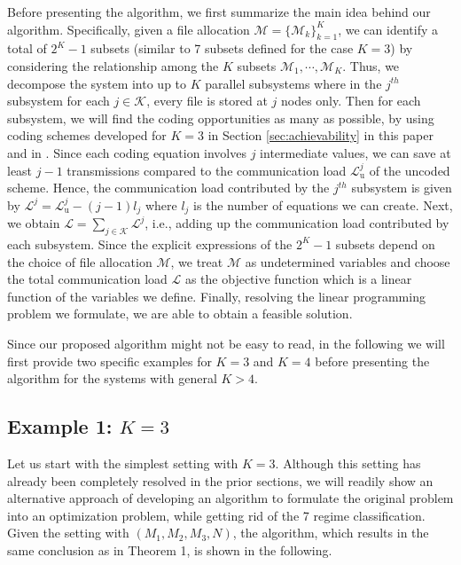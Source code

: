 \documentclass[conference]{IEEEtran}
\begin{document}
Before presenting the algorithm, we first summarize the main idea behind our algorithm. Specifically, given a file allocation $\mathcal{M}=\{\mathcal{M}_k\}_{k=1}^K$, we can identify a total of $2^K-1$ subsets (similar to 7 subsets defined for the case $K=3$) by considering the relationship among the $K$ subsets $\mathcal{M}_1,\cdots,\mathcal{M}_K$. Thus, we decompose the system into up to $K$ parallel subsystems where in the $j^{th}$ subsystem for each $j\in\mathcal{K}$, every file is stored at $j$ nodes only. Then for each subsystem, we will find the coding opportunities as many as possible, by using coding schemes developed for $K=3$ in Section \ref{sec:achievability} in this paper and in \cite{Avestimehr_CDC}. Since each coding equation involves $j$ intermediate values, we can save at least $j-1$ transmissions compared to the communication load $\mathcal{L}^j_{\textrm{u}}$ of the uncoded scheme. Hence, the communication load contributed by the $j^{th}$ subsystem is given by $\mathcal{L}^j=\mathcal{L}^j_{\textrm{u}}-(j-1)l_j$ where $l_j$ is the number of equations we can create. Next, we obtain $\mathcal{L}=\sum_{j\in\mathcal{K}} \mathcal{L}^j$, i.e., adding up the communication load contributed by each subsystem. Since the explicit expressions of the $2^K-1$ subsets depend on the choice of file allocation $\mathcal{M}$, we treat $\mathcal{M}$ as undetermined variables and choose the total communication load $\mathcal{L}$ as the objective function which is a linear function of the variables we define. Finally, resolving the linear programming problem we formulate, we are able to obtain a feasible solution.

Since our proposed algorithm might not be easy to read, in the following we will first provide two specific examples for $K=3$ and $K=4$ before presenting the algorithm for the systems with general $K>4$.



\subsection{Example 1: $K=3$}

Let us start with the simplest setting with $K=3$. Although this setting has already been completely resolved in the prior sections, we will readily show an alternative approach of developing an algorithm to formulate the original problem into an optimization problem, while getting rid of the 7 regime classification. Given the setting with $(M_1,M_2,M_3,N)$, the algorithm, which results in the same conclusion as in Theorem 1, is shown in the following.
\end{document}
